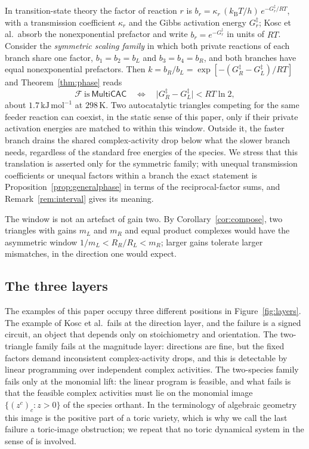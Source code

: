 \documentclass[11pt,a4paper]{article}
\theoremstyle{plain}
\theoremstyle{definition}
\theoremstyle{remark}
\newcommand{\cF}{\mathcal{F}}
\newcommand{\MCAC}{\mathsf{MultiCAC}}
\begin{document}
In transition-state theory \citep{eyring1935} the factor of reaction $r$ is $b_r=\kappa_r\,(k_{\mathrm B}T/h)\,e^{-G_r^{\ddagger}/RT}$, with a transmission coefficient $\kappa_r$ and the Gibbs activation energy $G_r^{\ddagger}$; Kosc et al.\ absorb the nonexponential prefactor and write $b_r=e^{-G_r^{\ddagger}}$ in units of $RT$. Consider the \emph{symmetric scaling family} in which both private reactions of each branch share one factor, $b_1=b_2=b_L$ and $b_3=b_4=b_R$, and both branches have equal nonexponential prefactors. Then $k=b_R/b_L=\exp[-(G_R^{\ddagger}-G_L^{\ddagger})/RT]$ and Theorem~\ref{thm:phase} reads
\[
  \cF\ \text{is}\ \MCAC \quad\Longleftrightarrow\quad \bigl|G_R^{\ddagger}-G_L^{\ddagger}\bigr|<RT\ln 2 ,
\]
about $1.7\,\mathrm{kJ\,mol^{-1}}$ at $298\,\mathrm{K}$. Two autocatalytic triangles competing for the same feeder reaction can coexist, in the static sense of this paper, only if their private activation energies are matched to within this window. Outside it, the faster branch drains the shared complex-activity drop below what the slower branch needs, regardless of the standard free energies of the species. We stress that this translation is asserted only for the symmetric family; with unequal transmission coefficients or unequal factors within a branch the exact statement is Proposition~\ref{prop:generalphase} in terms of the reciprocal-factor sums, and Remark~\ref{rem:interval} gives its meaning.

The window is not an artefact of gain two. By Corollary~\ref{cor:compose}, two triangles with gains $m_L$ and $m_R$ and equal product complexes would have the asymmetric window $1/m_L<R_R/R_L<m_R$; larger gains tolerate larger mismatches, in the direction one would expect.

\subsection{The three layers}

The examples of this paper occupy three different positions in Figure~\ref{fig:layers}. The example of Kosc et al.\ fails at the direction layer, and the failure is a signed circuit, an object that depends only on stoichiometry and orientation. The two-triangle family fails at the magnitude layer: directions are fine, but the fixed factors demand inconsistent complex-activity drops, and this is detectable by linear programming over independent complex activities. The two-species family fails only at the monomial lift: the linear program is feasible, and what fails is that the feasible complex activities must lie on the monomial image $\{(z^{c})_c:z>0\}$ of the species orthant. In the terminology of algebraic geometry this image is the positive part of a toric variety, which is why we call the last failure a toric-image obstruction; we repeat that no toric dynamical system in the sense of \citep{craciun2009} is involved.
\end{document}

